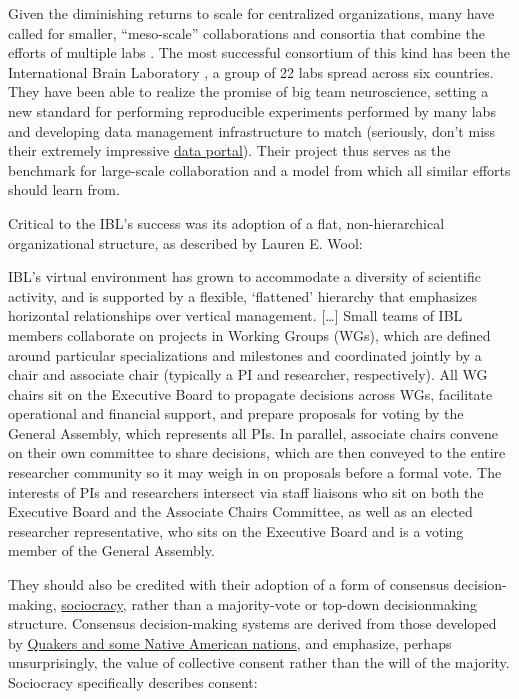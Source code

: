 \documentclass[10pt]{article}
\begin{document}
\begin{multicols}{2}
Given the diminishing returns to scale for centralized organizations,
many have called for smaller, ``meso-scale'' collaborations and
consortia that combine the efforts of multiple labs \cite{mainenBetterWayCrack2016} . The most successful consortium of this
kind has been the International Brain Laboratory \cite{abbottInternationalLaboratorySystems2017, woolKnowledgeNetworksHow2020} , a group of 22 labs spread across six countries. They have been
able to realize the promise of big team neuroscience, setting a new
standard for performing reproducible experiments performed by many labs
\cite{laboratoryStandardizedReproducibleMeasurement2020}  and
developing data management infrastructure to match \cite{laboratoryDataArchitectureLargescale2020}  (seriously, don't miss
their extremely impressive
\href{https://data.internationalbrainlab.org/}{data portal}). Their
project thus serves as the benchmark for large-scale collaboration and a
model from which all similar efforts should learn from.

Critical to the IBL's success was its adoption of a flat,
non-hierarchical organizational structure, as described by Lauren E.
Wool:

\begin{leftbar}
IBL's virtual environment has grown to accommodate a diversity of
scientific activity, and is supported by a flexible, `flattened'
hierarchy that emphasizes horizontal relationships over vertical
management. {[}\ldots{]} Small teams of IBL members collaborate on
projects in Working Groups (WGs), which are defined around particular
specializations and milestones and coordinated jointly by a chair and
associate chair (typically a PI and researcher, respectively). All WG
chairs sit on the Executive Board to propagate decisions across WGs,
facilitate operational and financial support, and prepare proposals for
voting by the General Assembly, which represents all PIs. In parallel,
associate chairs convene on their own committee to share decisions,
which are then conveyed to the entire researcher community so it may
weigh in on proposals before a formal vote. The interests of PIs and
researchers intersect via staff liaisons who sit on both the Executive
Board and the Associate Chairs Committee, as well as an elected
researcher representative, who sits on the Executive Board and is a
voting member of the General Assembly. \cite{woolKnowledgeNetworksHow2020} 
\end{leftbar}

They should also be credited with their adoption of a form of consensus
decision-making, \href{https://sociocracy.info}{sociocracy}, rather than
a majority-vote or top-down decisionmaking structure. Consensus
decision-making systems are derived from those developed by
\href{https://rhizomenetwork.wordpress.com/2011/06/18/a-brief-history-of-consenus-decision-making/}{Quakers
and some Native American nations}, and emphasize, perhaps
unsurprisingly, the value of collective consent rather than the will of
the majority. Sociocracy specifically describes consent:


\end{multicols}
\end{document}
